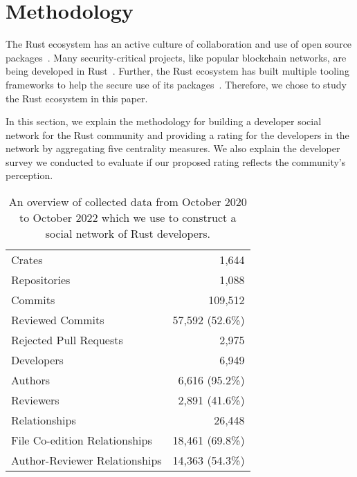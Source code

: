 \documentclass[10pt,journal,compsoc]{IEEEtran}
\begin{document}
\section{Methodology}
\label{sec:method}
The Rust ecosystem has an active culture of collaboration and use of open source packages~\cite{schueller2022evolving}.
Many security-critical projects, like popular blockchain networks, are being developed in Rust~\cite{yakovenko2018solana, wood2016polkadot}. Further, the Rust ecosystem has built multiple tooling frameworks to help the secure use of its packages~\cite{rustsecure}. Therefore, we chose to study the Rust ecosystem in this paper. 

In this section, we explain the methodology for building a developer social network for the Rust community and providing a rating for the developers in the network by aggregating five centrality measures. We also explain the developer survey we conducted to evaluate if our proposed rating reflects the community's perception. 

\begin{table}[]
    \centering
    \caption{An overview of collected data from October 2020 to October 2022 which we use to construct a social network of Rust developers.}
    \begin{tabular}{lr}
        \hline
        Crates & 1,644 \\
        Repositories & 1,088 \\
        Commits & 109,512 \\
        Reviewed Commits & 57,592 (52.6\%) \\
        Rejected Pull Requests & 2,975 \\ 
        \hline
        Developers & 6,949 \\
        Authors & 6,616 (95.2\%) \\
        Reviewers & 2,891 (41.6\%) \\
        \hline
        Relationships & 26,448 \\
        File Co-edition Relationships  & 18,461 (69.8\%)\\
        Author-Reviewer Relationships & 14,363 (54.3\%) \\
        \hline
    \end{tabular}
    \label{tab:dataset}
\end{table}
\end{document}
